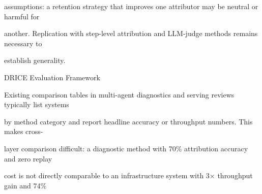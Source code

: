 \begin{flushleft}
\noindent assumptions: a retention strategy that improves one attributor may be neutral or harmful for\par
\noindent another. Replication with step-level attribution and LLM-judge methods remains necessary to\par
\noindent establish generality.\par
\par\smallskip
\par\smallskip
{} DRICE Evaluation Framework\par
\noindent Existing comparison tables in multi-agent diagnostics and serving reviews typically list systems\par
\noindent by method category and report headline accuracy or throughput numbers. This makes cross-\par
\noindent layer comparison difficult: a diagnostic method with 70\% attribution accuracy and zero replay\par
\noindent cost is not directly comparable to an infrastructure system with 3× throughput gain and 74\%\par
\end{flushleft}
